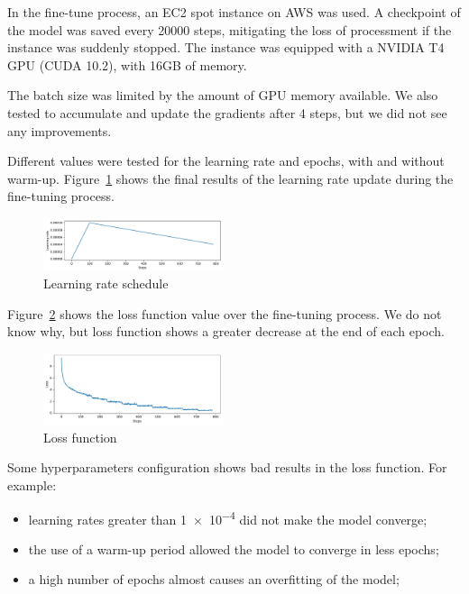 \documentclass[letterpaper]{article}
\begin{document}
In the fine-tune process, an EC2 spot instance on AWS was used. A checkpoint of the model was saved every \num{20000} steps, mitigating the loss of processment if the instance was suddenly stopped. The instance was equipped with a NVIDIA T4 GPU (CUDA \num{10.2}), with \num{16}{GB} of memory.

The batch size was limited by the amount of GPU memory available. We also tested to accumulate and update the gradients after \num{4} steps, but we did not see any improvements.

Different values were tested for the learning rate and epochs, with and without warm-up. Figure~\ref{fig:learning-rate-schedule} shows the final results of the learning rate update during the fine-tuning process.

\begin{figure}[ht]
    \centering
    \includegraphics[width=0.47\textwidth]{../images/warmup_linear_schedule.pdf}
    \caption{Learning rate schedule}
    \label{fig:learning-rate-schedule}
\end{figure}

Figure~\ref{fig:loss} shows the loss function value over the fine-tuning process. We do not know why, but loss function shows a greater decrease at the end of each epoch.

\begin{figure}[ht]
    \centering
    \includegraphics[width=0.47\textwidth]{../images/loss_function.pdf}
    \caption{Loss function}
    \label{fig:loss}
\end{figure}

Some hyperparameters configuration shows bad results in the loss function. For example:

\begin{itemize}
    \item learning rates greater than \num{1e-4} did not make the model converge;
    \item the use of a warm-up period allowed the model to converge in less epochs;
    \item a high number of epochs almost causes an overfitting of the model;
\end{itemize}
\end{document}
